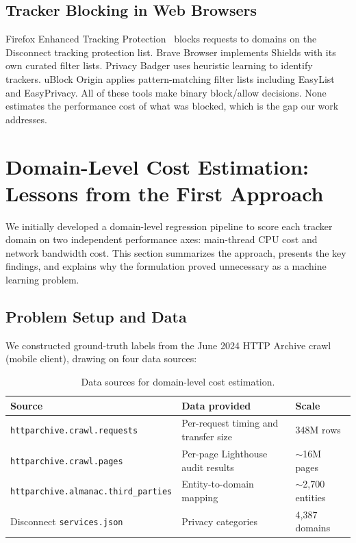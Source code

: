 \documentclass[11pt]{article}
\begin{document}
\subsection{Tracker Blocking in Web Browsers}

Firefox Enhanced Tracking Protection~\citep{disconnectlist} blocks requests to domains on the Disconnect tracking protection list. Brave Browser implements Shields with its own curated filter lists. Privacy Badger uses heuristic learning to identify trackers. uBlock Origin applies pattern-matching filter lists including EasyList and EasyPrivacy. All of these tools make binary block/allow decisions. None estimates the performance cost of what was blocked, which is the gap our work addresses.


\section{Domain-Level Cost Estimation: Lessons from the First Approach}
\label{sec:domain-level}

We initially developed a domain-level regression pipeline to score each tracker domain on two independent performance axes: main-thread CPU cost and network bandwidth cost. This section summarizes the approach, presents the key findings, and explains why the formulation proved unnecessary as a machine learning problem.

\subsection{Problem Setup and Data}

We constructed ground-truth labels from the June 2024 HTTP Archive crawl (mobile client), drawing on four data sources:

\begin{table}[h]
\centering
\small
\begin{tabular}{lll}
\toprule
Source & Data provided & Scale \\
\midrule
\texttt{httparchive.crawl.requests} & Per-request timing and transfer size & 348M rows \\
\texttt{httparchive.crawl.pages} & Per-page Lighthouse audit results & $\sim$16M pages \\
\texttt{httparchive.almanac.third\_parties} & Entity-to-domain mapping & $\sim$2,700 entities \\
Disconnect \texttt{services.json} & Privacy categories & 4,387 domains \\
\bottomrule
\end{tabular}
\caption{Data sources for domain-level cost estimation.}
\label{tab:data-sources}
\end{table}
\end{document}

